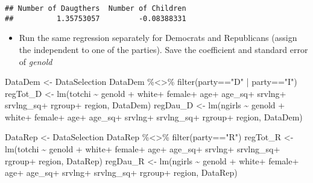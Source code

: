 \documentclass[
]{article}
\newenvironment{Shaded}{\begin{snugshade}}{\end{snugshade}}
\newcommand{\FunctionTok}[1]{\textcolor[rgb]{0.00,0.00,0.00}{#1}}
\newcommand{\NormalTok}[1]{#1}
\newcommand{\OtherTok}[1]{\textcolor[rgb]{0.56,0.35,0.01}{#1}}
\newcommand{\SpecialCharTok}[1]{\textcolor[rgb]{0.00,0.00,0.00}{#1}}
\newcommand{\StringTok}[1]{\textcolor[rgb]{0.31,0.60,0.02}{#1}}
\providecommand{\tightlist}{%
  \setlength{\itemsep}{0pt}\setlength{\parskip}{0pt}}
\begin{document}
\begin{verbatim}
## Number of Daugthers  Number of Children 
##          1.35753057         -0.08388331
\end{verbatim}

\begin{itemize}
\tightlist
\item
  Run the same regression separately for Democrats and Republicans
  (assign the independent to one of the parties). Save the coefficient
  and standard error of \emph{genold}
\end{itemize}

\begin{Shaded}
\begin{Highlighting}[]
\NormalTok{DataDem }\OtherTok{\textless{}{-}}\NormalTok{ DataSelection}
\NormalTok{DataDem }\SpecialCharTok{\%\textless{}\textgreater{}\%} \FunctionTok{filter}\NormalTok{(party}\SpecialCharTok{==}\StringTok{"D"} \SpecialCharTok{|}\NormalTok{ party}\SpecialCharTok{==}\StringTok{"I"}\NormalTok{)}
\NormalTok{regTot\_D }\OtherTok{\textless{}{-}} \FunctionTok{lm}\NormalTok{(totchi }\SpecialCharTok{\textasciitilde{}}\NormalTok{ genold }\SpecialCharTok{+}\NormalTok{ white}\SpecialCharTok{+}\NormalTok{ female}\SpecialCharTok{+}\NormalTok{ age}\SpecialCharTok{+}\NormalTok{ age\_sq}\SpecialCharTok{+}\NormalTok{ srvlng}\SpecialCharTok{+}\NormalTok{ srvlng\_sq}\SpecialCharTok{+}\NormalTok{ rgroup}\SpecialCharTok{+}\NormalTok{ region, DataDem)}
\NormalTok{regDau\_D }\OtherTok{\textless{}{-}} \FunctionTok{lm}\NormalTok{(ngirls }\SpecialCharTok{\textasciitilde{}}\NormalTok{ genold }\SpecialCharTok{+}\NormalTok{ white}\SpecialCharTok{+}\NormalTok{ female}\SpecialCharTok{+}\NormalTok{ age}\SpecialCharTok{+}\NormalTok{ age\_sq}\SpecialCharTok{+}\NormalTok{ srvlng}\SpecialCharTok{+}\NormalTok{ srvlng\_sq}\SpecialCharTok{+}\NormalTok{ rgroup}\SpecialCharTok{+}\NormalTok{ region, DataDem)}

\NormalTok{DataRep }\OtherTok{\textless{}{-}}\NormalTok{ DataSelection}
\NormalTok{DataRep }\SpecialCharTok{\%\textless{}\textgreater{}\%} \FunctionTok{filter}\NormalTok{(party}\SpecialCharTok{==}\StringTok{"R"}\NormalTok{)}
\NormalTok{regTot\_R }\OtherTok{\textless{}{-}} \FunctionTok{lm}\NormalTok{(totchi }\SpecialCharTok{\textasciitilde{}}\NormalTok{ genold }\SpecialCharTok{+}\NormalTok{ white}\SpecialCharTok{+}\NormalTok{ female}\SpecialCharTok{+}\NormalTok{ age}\SpecialCharTok{+}\NormalTok{ age\_sq}\SpecialCharTok{+}\NormalTok{ srvlng}\SpecialCharTok{+}\NormalTok{ srvlng\_sq}\SpecialCharTok{+}\NormalTok{ rgroup}\SpecialCharTok{+}\NormalTok{ region, DataRep)}
\NormalTok{regDau\_R }\OtherTok{\textless{}{-}} \FunctionTok{lm}\NormalTok{(ngirls }\SpecialCharTok{\textasciitilde{}}\NormalTok{ genold }\SpecialCharTok{+}\NormalTok{ white}\SpecialCharTok{+}\NormalTok{ female}\SpecialCharTok{+}\NormalTok{ age}\SpecialCharTok{+}\NormalTok{ age\_sq}\SpecialCharTok{+}\NormalTok{ srvlng}\SpecialCharTok{+}\NormalTok{ srvlng\_sq}\SpecialCharTok{+}\NormalTok{ rgroup}\SpecialCharTok{+}\NormalTok{ region, DataRep)}
\end{Highlighting}
\end{Shaded}
\end{document}
